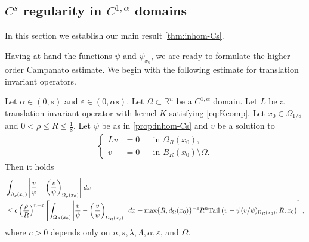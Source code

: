 \documentclass[11pt,reqno]{amsart}
\theoremstyle{plain}
\theoremstyle{definition}
\numberwithin{equation}{section}
\newcommand{\R}{\mathbb{R}}
\newcommand{\eps}{\varepsilon}
\newcommand{\1}{\mathbbm{1}}
\renewcommand{\d}{\textnormal{\,d}}
\begin{document}
\subsection{\texorpdfstring{$C^s$}{Cs} regularity in \texorpdfstring{$C^{1,\alpha}$}{C1,alpha} domains}

In this section we establish our main result \autoref{thm:inhom-Cs}.

Having at hand the functions $\psi$ and $\psi_{x_0}$, we are ready to formulate the higher order Campanato estimate. We begin with the following estimate for translation invariant operators.

\begin{lemma}
\label{lemma:T4-inhom}
Let  $\alpha \in (0,s)$ and $\eps \in (0,\alpha s)$. Let $\Omega \subset \R^n$ be a $C^{1,\alpha }$ domain.
Let $L$ be a translation invariant operator with kernel $K$ satisfying \eqref{eq:Kcomp}. Let $x_0 \in \Omega_{1/8}$ and $0<\rho\leq R\leq \frac{1}{8}$.  Let $\psi$ be as in \autoref{prop:inhom-Cs} and $v$ be a solution to
\begin{align*}
\left\{
\begin{aligned}
Lv&=0 &&\text{in }\Omega_R(x_0), \\
v&=0 &&\text{in } B_R(x_0) \setminus \Omega.
\end{aligned}
\right.
\end{align*}
Then it holds
\begin{align*}
\begin{split}
&\int_{\Omega_{\rho}(x_0)} \left|\frac{v}{\psi} - \left( \frac{v}{\psi} \right)_{\Omega_{\rho}(x_0)} \right| \d x \\
&\leq c \left( \frac{\rho}{R} \right)^{n+\eps} \left[ \int_{\Omega_R(x_0)} \left|\frac{v}{\psi} - \left( \frac{v}{\psi} \right)_{\Omega_R(x_0)} \right| \d x + \max\{R,d_{\Omega}(x_0)\}^{-s} R^{n}  \mathrm{Tail} \left(v- \psi (v/\psi)_{\Omega_R(x_0)}; R, x_0 \right) \right],
\end{split}
\end{align*}
where $c > 0$ depends only on $n,s,\lambda,\Lambda,\alpha,\eps$, and $\Omega$.
\end{lemma}
\end{document}
